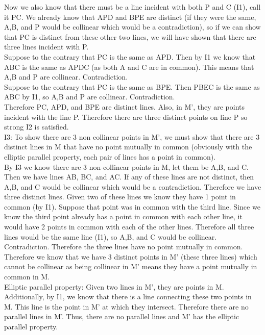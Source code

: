 \documentclass[12pt,letterpaper]{article}
\begin{document}
Now we also know that there must be a line incident with both P and C (I1), call it PC.  We already know that APD and BPE are distinct (if they were the same, A,B, and P would be collinear which would be a contradiction), so if we can show that PC is distinct from these other two lines, we will have shown that there are three lines incident with P. \\

Suppose to the contrary that PC is the same as APD.  Then by I1 we know that ABC is the same as APDC (as both A and C are in common).  This means that A,B and P are collinear.  Contradiction.\\

Suppose to the contrary that PC is the same as BPE.  Then PBEC is the same as ABC by I1, so A,B and P are collinear.  Contradiction. \\

Therefore PC, APD, and BPE are distinct lines.  Also, in M', they are points incident with the line P.  Therefore there are three distinct points on line P so strong I2 is satisfied.\\


I3: To show there are 3 non collinear points in M', we must show that there are 3 distinct lines in M that have no point mutually in common (obviously with the elliptic parallel property, each pair of lines has a point in common).  \\

By I3 we know there are 3 non-collinear points in M, let them be A,B, and C.  Then we have lines AB, BC, and AC.  If any of these lines are not distinct, then A,B, and C would be collinear which would be a contradiction.  Therefore we have three distinct lines.  Given two of these lines we know they have 1 point in common (by I1).  Suppose that point was in common with the third line.  Since we know the third point already has a point in common with each other line, it would have 2 points in common with each of the other lines.  Therefore all three lines would be the same line (I1), so A,B, and C would be collinear. Contradiction.  Therefore the three lines have no point mutually in common. \\

Therefore we know that we have 3 distinct points in M' (these three lines) which cannot be collinear as being collinear in M' means they have a point mutually in common in M.\\



Elliptic parallel property:  Given two lines in M', they are points in M.  Additionally, by I1, we know that there is a line connecting these two points in M.  This line is the point in M' at which they intersect.  Therefore there are no parallel lines in M'.  Thus, there are no parallel lines and M' has the elliptic parallel property.
\end{document}
